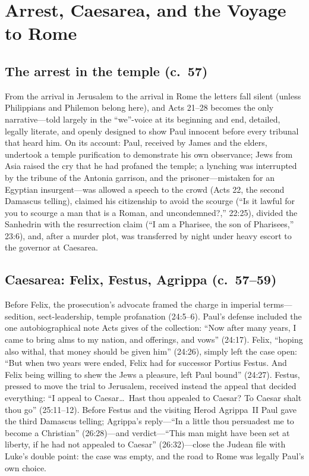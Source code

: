 \section{Arrest, Caesarea, and the Voyage to Rome}

\subsection{The arrest in the temple (c.~57)}

From the arrival in Jerusalem to the arrival in Rome the letters fall
silent (unless Philippians and Philemon belong here), and Acts 21--28
becomes the only narrative---told largely in the ``we''-voice at its
beginning and end, detailed, legally literate, and openly designed to
show Paul innocent before every tribunal that heard him. On its account:
Paul, received by James and the elders, undertook a temple purification to
demonstrate his own observance; Jews from Asia raised the cry that he had
profaned the temple; a lynching was interrupted by the tribune of the
Antonia garrison, and the prisoner---mistaken for an Egyptian
insurgent---was allowed a speech to the crowd (Acts 22, the second
Damascus telling), claimed his citizenship to avoid the scourge (``Is it
lawful for you to scourge a man that is a Roman, and uncondemned?,''
22:25), divided the Sanhedrin with the resurrection claim (``I am a
Pharisee, the son of Pharisees,'' 23:6), and, after a murder plot, was
transferred by night under heavy escort to the governor at Caesarea.

\subsection{Caesarea: Felix, Festus, Agrippa (c.~57--59)}

Before Felix, the prosecution's advocate framed the charge in imperial
terms---sedition, sect-leadership, temple profanation (24:5--6). Paul's
defense included the one autobiographical note Acts gives of the
collection: ``Now after many years, I came to bring alms to my nation,
and offerings, and vows'' (24:17). Felix, ``hoping also withal, that
money should be given him'' (24:26), simply left the case open: ``But
when two years were ended, Felix had for successor Portius Festus. And
Felix being willing to shew the Jews a pleasure, left Paul bound''
(24:27). Festus, pressed to move the trial to Jerusalem, received
instead the appeal that decided everything: ``I appeal to Caesar\ldots\
Hast thou appealed to Caesar? To Caesar shalt thou go'' (25:11--12).
Before Festus and the visiting Herod Agrippa~II Paul gave the third
Damascus telling; Agrippa's reply---``In a little thou persuadest me to
become a Christian'' (26:28)---and verdict---``This man might have been
set at liberty, if he had not appealed to Caesar'' (26:32)---close the
Judean file with Luke's double point: the case was empty, and the road
to Rome was legally Paul's own choice.

